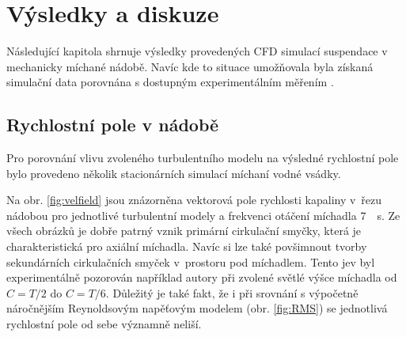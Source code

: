 \chapter{Výsledky a diskuze}
Následující kapitola shrnuje výsledky provedených CFD simulací suspendace v mechanicky míchané nádobě. Navíc kde to situace umožňovala byla získaná simulační data porovnána s dostupným experimentálním měřením \citep{pav11}.

\section{Rychlostní pole v nádobě}
Pro porovnání vlivu zvoleného turbulentního modelu na výsledné rychlostní pole bylo provedeno několik stacionárních simulací míchaní vodné vsádky. 

Na obr. \ref{fig:velfield} jsou znázorněna vektorová pole rychlosti kapaliny v~řezu nádobou pro jednotlivé turbulentní modely a frekvenci otáčení míchadla \SI{7}{\per\second}. Ze všech obrázků je dobře patrný vznik primární cirkulační smyčky, která je charakteristická pro axiální míchadla. Navíc si lze také povšimnout tvorby sekundárních cirkulačních smyček v~prostoru pod míchadlem. Tento jev byl experimentálně pozorován například autory \citet{hos10} při zvolené světlé výšce míchadla od $C=T/2$ do $C=T/6$. Důležitý je také fakt, že i při srovnání s výpočetně náročnějším Reynoldsovým napěťovým modelem (obr. \ref{fig:RMS}) se jednotlivá rychlostní pole od sebe významně neliší.

